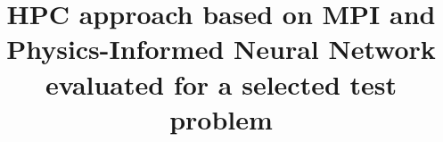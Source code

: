 \documentclass[conference]{IEEEtran}
\begin{document}

\title{HPC approach based on MPI and Physics-Informed Neural Network evaluated for a selected test problem
}

\author{
}

\maketitle
\thispagestyle{plain}
\pagestyle{plain}
\end{document}
